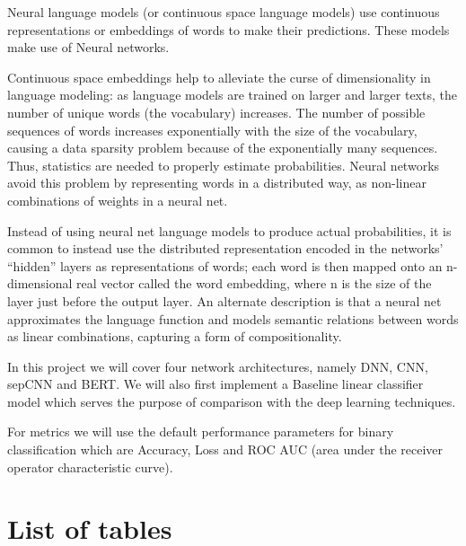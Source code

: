 \documentclass[
]{article}
\begin{document}
Neural language models (or continuous space language models) use
continuous representations or embeddings of words to make their
predictions. These models make use of Neural networks.

Continuous space embeddings help to alleviate the curse of
dimensionality in language modeling: as language models are trained on
larger and larger texts, the number of unique words (the vocabulary)
increases. The number of possible sequences of words increases
exponentially with the size of the vocabulary, causing a data sparsity
problem because of the exponentially many sequences. Thus, statistics
are needed to properly estimate probabilities. Neural networks avoid
this problem by representing words in a distributed way, as non-linear
combinations of weights in a neural net.

Instead of using neural net language models to produce actual
probabilities, it is common to instead use the distributed
representation encoded in the networks' ``hidden'' layers as
representations of words; each word is then mapped onto an n-dimensional
real vector called the word embedding, where n is the size of the layer
just before the output layer. An alternate description is that a neural
net approximates the language function and models semantic relations
between words as linear combinations, capturing a form of
compositionality.

In this project we will cover four network architectures, namely DNN,
CNN, sepCNN and BERT. We will also first implement a Baseline linear
classifier model which serves the purpose of comparison with the deep
learning techniques.

For metrics we will use the default performance parameters for binary
classification which are Accuracy, Loss and ROC AUC (area under the
receiver operator characteristic curve).

\newpage 
\clearpage
{}
\setcounter{secnumdepth}{5}
\setcounter{tocdepth}{5}

\cleardoublepage  \hypertarget{toc}{}
\bookmark[dest=toc,level=chapter]{\contentsname} \tableofcontents

\clearpage

\newpage
\clearpage
{}

\hypertarget{list-of-tables}{%
\section*{List of tables}\label{list-of-tables}}
\end{document}

